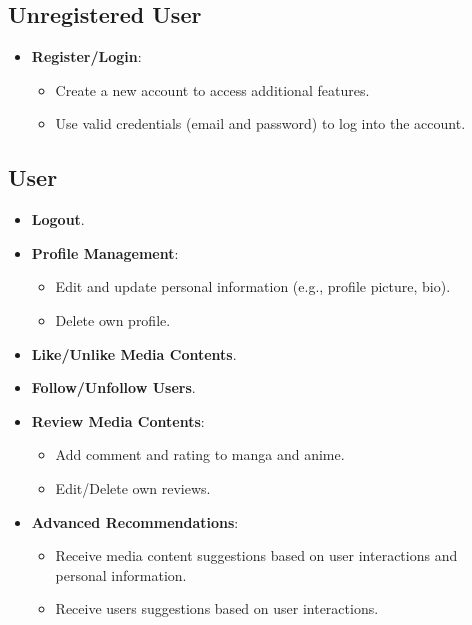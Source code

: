 \subsection*{Unregistered User}

\begin{itemize}
    \item \textbf{Register/Login}:
    \begin{itemize}
        \item Create a new account to access additional features.
        \item Use valid credentials (email and password) to log into the account.
    \end{itemize}
\end{itemize}

\subsection*{User}

\begin{itemize}
    \item \textbf{Logout}.
    
    \item \textbf{Profile Management}:
    \begin{itemize}
        \item Edit and update personal information (e.g., profile picture, bio).
        \item Delete own profile.
    \end{itemize}
    
    \item \textbf{Like/Unlike Media Contents}.
    
    \item \textbf{Follow/Unfollow Users}.
    
    \item \textbf{Review Media Contents}:
    \begin{itemize}
        \item Add comment and rating to manga and anime.
        \item Edit/Delete own reviews.
    \end{itemize}
    
    \item \textbf{Advanced Recommendations}:
    \begin{itemize}
        \item Receive media content suggestions based on user interactions and personal information.
        \item Receive users suggestions based on user interactions.
    \end{itemize}
\end{itemize}

